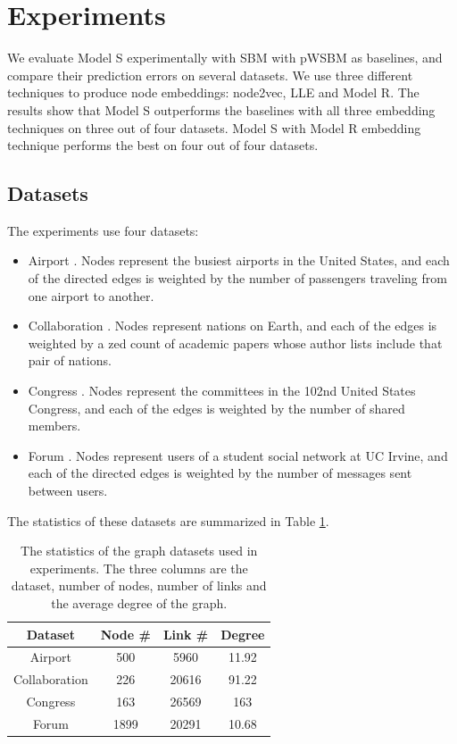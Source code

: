 \documentclass[12pt]{WSUThesis}
\theoremstyle{definition}
\begin{document}
\section{Experiments}
We evaluate Model S experimentally with SBM with pWSBM as baselines,
and compare their prediction errors on several datasets.
We use three different techniques to produce node embeddings: node2vec, LLE and Model R.
The results show that Model S outperforms the baselines with all three embedding techniques on three out of four datasets.
Model S with Model R embedding technique performs the best on four out of four datasets.

\subsection{Datasets}
The experiments use four datasets:
\begin{itemize}
	\item Airport \cite{colizza2007reaction}. Nodes represent the busiest airports in the United States, and each of the directed edges is weighted by the number of passengers traveling from one airport to another.
	\item Collaboration \cite{pan2012world}. Nodes represent nations on Earth, and each of the edges	is weighted by a zed count of academic papers whose author lists include that pair of nations.
	\item Congress \cite{porter2005network}. Nodes represent the committees in the 102nd United States Congress, and each of the edges is weighted by the number of shared members.
	\item Forum \cite{opsahl2009clustering}. Nodes represent users of a student social network at UC Irvine, and each of the directed edges is weighted by the number of messages sent between users.
\end{itemize}

The statistics of these datasets are summarized in Table \ref{tab:datasets-graphs}.
\begin{table}[!ht]\centering
	\caption{
		The statistics of the graph datasets used in experiments.
		The three columns are the dataset, number of nodes, number of links and the average degree of the graph.
	}
	\begin{tabular}{cccc}  \hline
		Dataset & Node \# & Link \# & Degree \\ \hline
		Airport & 500 & 5960 & 11.92 \\ \hline
		Collaboration & 226 & 20616 & 91.22 \\ \hline
		Congress & 163 & 26569 & 163 \\ \hline
		Forum  & 1899 & 20291 & 10.68 \\ \hline
	\end{tabular}
	\label{tab:datasets-graphs}
\end{table}
\end{document}
